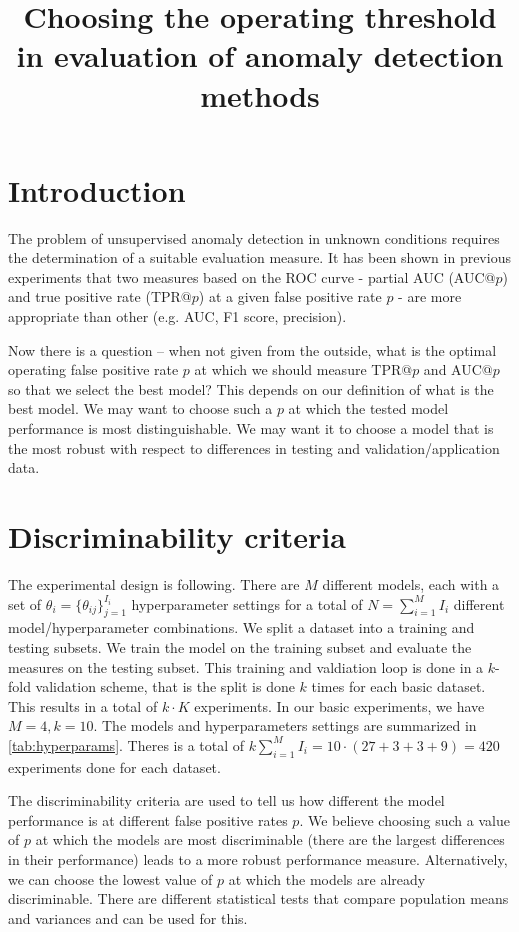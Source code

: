 \documentclass[a4paper]{article}
\begin{document}
\title{Choosing the operating threshold in evaluation of anomaly detection methods}
\maketitle

\section{Introduction}
The problem of unsupervised anomaly detection in unknown conditions requires the determination of a suitable evaluation measure. It has been shown in previous experiments that two measures based on the ROC curve - partial AUC (AUC@$p$) and true positive rate (TPR@$p$) at a given false positive rate $p$ - are more appropriate than other (e.g. AUC, F1 score, precision). 

Now there is a question -- when not given from the outside, what is the optimal operating false positive rate $p$ at which we should measure TPR@$p$ and AUC@$p$ so that we select the best model? This depends on our definition of what is the best model. We may want to choose such a $p$ at which the tested model performance is most distinguishable. We may want it to choose a model that is the most robust with respect to differences in testing and validation/application data. 

\section{Discriminability criteria}
The experimental design is following. There are $M$ different models, each with a set of $\theta_{i} = \lbrace \theta_{ij} \rbrace_{j=1}^{I_i}$ hyperparameter settings for a total of $N=\sum_{i=1}^M I_i$ different model/hyperparameter combinations. We split a dataset into a training and testing subsets. We train the model on the training subset and evaluate the measures on the testing subset. This training and valdiation loop is done in a $k$-fold validation scheme, that is the split is done $k$ times for each basic dataset. This results in a total of $k\cdot K$ experiments. In our basic experiments, we have $M=4, k=10$. The models and hyperparameters settings are summarized in \ref{tab:hyperparams}. Theres is a total of $k \sum_{i=1}^M I_i = 10 \cdot (27 + 3 + 3 + 9) = 420$ experiments done for each dataset. 



The discriminability criteria are used to tell us how different the model performance is at different false positive rates $p$. We believe choosing such a value of $p$ at which the models are most discriminable (there are the largest differences in their performance) leads to a more robust performance measure. Alternatively, we can choose the lowest value of $p$ at which the models are already discriminable. There are different statistical tests that compare population means and variances and can be used for this.
\end{document}
